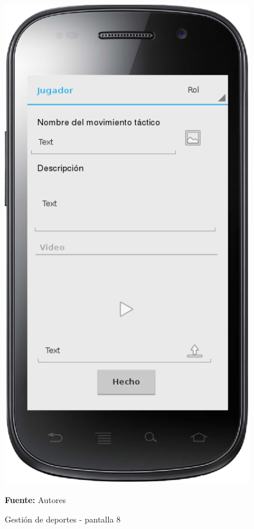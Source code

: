 \begin{figure}[!htb]
  \begin{center}
    \includegraphics[width=11cm]{./imagenes/UI/Deportes/gestion_deportes_8.png}
    \caption{Gestión de deportes - pantalla 8}
    \label{fig:gestion_deportes_8}
    \textbf{Fuente:}  Autores
  \end{center}
\end{figure}

